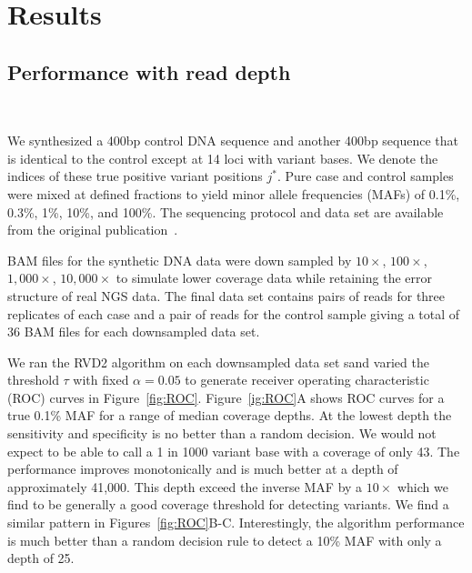 \documentclass[11pt,reqno]{amsart}
\begin{document}
%
%
%


\section{Results}

\subsection{Performance with read depth}\

We synthesized a 400bp control DNA sequence and another 400bp sequence that is identical to the control except at 14 loci with variant bases. We denote the indices of these true positive variant positions $j^*$. Pure case and control samples were mixed at defined fractions to yield minor allele frequencies (MAFs) of 0.1\%, 0.3\%, 1\%, 10\%, and 100\%. The sequencing protocol and data set are available from the original publication~\cite{}.

BAM files for the synthetic DNA data were down sampled by $10\times$, $100\times$, $1,000\times$, $10,000\times$ to simulate lower coverage data while retaining the error structure of real NGS data. The final data set contains pairs of reads for three replicates of each case and a pair of reads for the control sample giving a total of 36 BAM files for each downsampled data set.

We ran the RVD2 algorithm on each downsampled data set sand varied the threshold $\tau$ with fixed $\alpha=0.05$ to generate receiver operating characteristic (ROC) curves in Figure~\ref{fig:ROC}. Figure~\ref{ig:ROC}A shows ROC curves for a true 0.1\% MAF for a range of median coverage depths. At the lowest depth the sensitivity and specificity is no better than a random decision. We would not expect to be able to call a 1 in 1000 variant base with a coverage of only 43. The performance improves monotonically and is much better at a depth of approximately 41,000. This depth exceed the inverse MAF by a $10\times$ which we find to be generally a good coverage threshold for detecting variants. We find a similar pattern in Figures~\ref{fig:ROC}B-C. Interestingly, the algorithm performance is much better than a random decision rule to detect a 10\% MAF with only a depth of 25.
\end{document}
